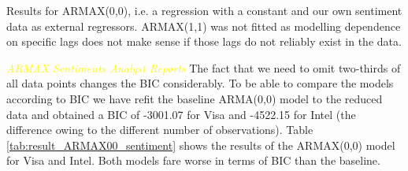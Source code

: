 \begin{table}[h!]
    \centering
    \vspace{-2ex}
    \small
    
    \vspace{1ex}
    
    \vspace{-2ex}
    \small
    
    \caption{Results for ARMAX(0,0), i.e. a regression with a constant and our own sentiment data as external regressors. ARMAX(1,1) was not fitted as modelling dependence on specific lags does not make sense if those lags do not reliably exist in the data.}
    \label{tab:result_ARMAX00_sentiment}
\end{table}{}

\textit{\textcolor{yellow}{ARMAX Sentiments Analyst Reports}}
The fact that we need to omit two-thirds of all data points changes the BIC considerably. To be able to compare the models according to BIC we have refit the baseline ARMA(0,0) model to the reduced data and obtained a BIC of -3001.07 for Visa and -4522.15 for Intel  (the difference owing to the different number of observations). Table \ref{tab:result_ARMAX00_sentiment} shows the results of the ARMAX(0,0) model for Visa and Intel. Both models fare worse in terms of BIC than the baseline. 

